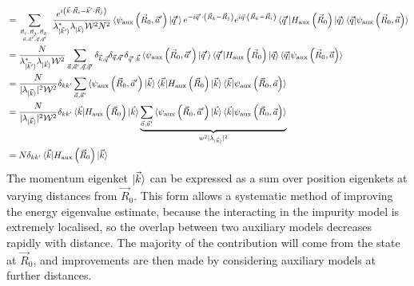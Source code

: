 \documentclass{report}
\numberwithin{equation}{section}
\begin{document}
\begin{appendices}
\begin{equation}
\begin{aligned}
								   &= \sum_{\vec R_i, \vec R_j, \vec R_k, \atop{\vec a, \vec a^\prime, \vec q, \vec q^\prime}}\frac{e^{i\left(\vec{k}\cdot\vec{R}_i - \vec{k}^\prime\cdot\vec{R}_j\right)}}{\lambda^*_{\ket{\vec k^\prime}} \lambda_{\ket{\vec k}} \mathcal{W}^2 N^2} \braket{\psi_\text{aux}\left(\vec R_0, \vec a^\prime\right)| \vec q^\prime} e^{-i \vec q^\prime \cdot \left(\vec R_k - \vec R_j\right) } e^{i \vec q \cdot \left(\vec R_k - \vec R_i\right)} \braket{\vec q^\prime | H_\text{aux}\left(\vec R_0\right) | \vec q}  \braket{\vec q | \psi_\text{aux}\left(\vec R_0, \vec a\right)}\\
								   &= \frac{N}{\lambda^*_{\ket{\vec k^\prime}} \lambda_{\ket{\vec k}} \mathcal{W}^2}\sum_{\vec a, \vec a^\prime, \vec q, \vec q^\prime} \delta_{\vec k, \vec q} \delta_{\vec q,\vec q^\prime} \delta_{\vec q^\prime,\vec k} \braket{\psi_\text{aux}\left(\vec R_0, \vec a^\prime\right)| \vec q^\prime} \braket{\vec q^\prime | H_\text{aux}\left(\vec R_0\right) | \vec q}  \braket{\vec q | \psi_\text{aux}\left(\vec R_0, \vec a\right)}\\
								   &= \frac{N}{|\lambda_{\ket{\vec k}}|^2 \mathcal{W}^2}\delta_{kk^\prime}\sum_{\vec a, \vec a^\prime} \braket{\psi_\text{aux}\left(\vec R_0, \vec a^\prime\right)| \vec k} \braket{\vec k | H_\text{aux}\left(\vec R_0\right) | \vec k}  \braket{\vec k | \psi_\text{aux}\left(\vec R_0, \vec a\right)}\\
								   &= \frac{N}{|\lambda_{\ket{\vec k}}|^2 \mathcal{W}^2}\delta_{kk^\prime}\braket{\vec k | H_\text{aux}\left(\vec R_0\right) | \vec k} \underbrace{\sum_{\vec a, \vec a^\prime} \braket{\psi_\text{aux}\left(\vec R_0, \vec a^\prime\right)| \vec k} \braket{\vec k | \psi_\text{aux}\left(\vec R_0, \vec a\right)}}_{w^2 |\lambda_{\ket{\vec k}}|^2}\\
	&= N\delta_{kk^\prime}\braket{\vec k | H_\text{aux}\left(\vec R_0\right) | \vec k}
\end{aligned}\end{equation}
The momentum eigenket \(\ket{\vec k}\) can be expressed as a sum over position eigenkets at varying distances from \(\vec R_0\). This form allows a systematic method of improving the energy eigenvalue estimate, because the interacting in the impurity model is extremely localised, so the overlap between two auxiliary models decreases rapidly with distance. The majority of the contribution will come from the state at \(\vec R_0\), and improvements are then made by considering auxiliary models at further distances. 


\end{appendices}


\end{document}
